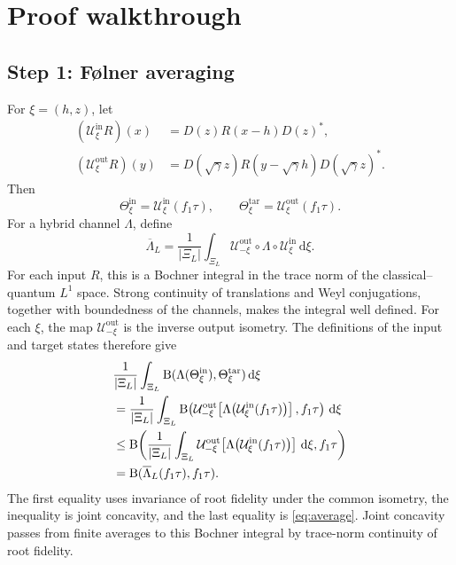 \documentclass[11pt]{article}
\newcommand{\dd}{\,\mathrm d}
\newcommand{\B}{\mathrm B}
\begin{document}
\section{Proof walkthrough}

\subsection*{Step 1: F\o lner averaging}

For $\xi=(h,z)$, let
\begin{align*}
  (\mathcal U_\xi^{\mathrm{in}}R)(x)
  &=D(z)R(x-h)D(z)^*,\\
  (\mathcal U_\xi^{\mathrm{out}}R)(y)
  &=D(\sqrt\gamma z)R(y-\sqrt\gamma h)D(\sqrt\gamma z)^*.
\end{align*}
Then
\[
  \Theta_\xi^{\mathrm{in}}
  =\mathcal U_\xi^{\mathrm{in}}(f_1\tau),
  \qquad
  \Theta_\xi^{\mathrm{tar}}
  =\mathcal U_\xi^{\mathrm{out}}(f_1\tau).
\]
For a hybrid channel $\Lambda$, define
\begin{equation}\label{eq:average}
  \overline\Lambda_L
  =\frac1{|\Xi_L|}\int_{\Xi_L}
  \mathcal U_{-\xi}^{\mathrm{out}}\circ\Lambda\circ
  \mathcal U_\xi^{\mathrm{in}}\dd\xi.
\end{equation}
For each input $R$, this is a Bochner integral in the trace norm of the
classical--quantum $L^1$ space.  Strong continuity of translations and Weyl
conjugations, together with boundedness of the channels, makes the integral
well defined.
For each $\xi$, the map $\mathcal U_{-\xi}^{\mathrm{out}}$ is the inverse
output isometry.  The definitions of the input and target states therefore
give
\begin{align}
 &\frac1{|\Xi_L|}\int_{\Xi_L}
  \B(\Lambda(\Theta_\xi^{\mathrm{in}}),
    \Theta_\xi^{\mathrm{tar}})\dd\xi\notag\\
 &=\frac1{|\Xi_L|}\int_{\Xi_L}
  \B\!\left(
    \mathcal U_{-\xi}^{\mathrm{out}}\!\left[
      \Lambda\!\left(\mathcal U_\xi^{\mathrm{in}}(f_1\tau)\right)
    \right],
    f_1\tau\right)\dd\xi\notag\\
 &\leq
  \B\!\left(
    \frac1{|\Xi_L|}\int_{\Xi_L}
    \mathcal U_{-\xi}^{\mathrm{out}}\!\left[
      \Lambda\!\left(\mathcal U_\xi^{\mathrm{in}}(f_1\tau)\right)
    \right]\dd\xi,
    f_1\tau\right)\notag\\
 &=\B(\overline\Lambda_L(f_1\tau),f_1\tau).
 \label{eq:concavity}
\end{align}
The first equality uses invariance of root fidelity under the common
isometry, the inequality is joint concavity, and the last equality is
\eqref{eq:average}.  Joint concavity passes from finite averages to this
Bochner integral by trace-norm continuity of root fidelity.
\end{document}
